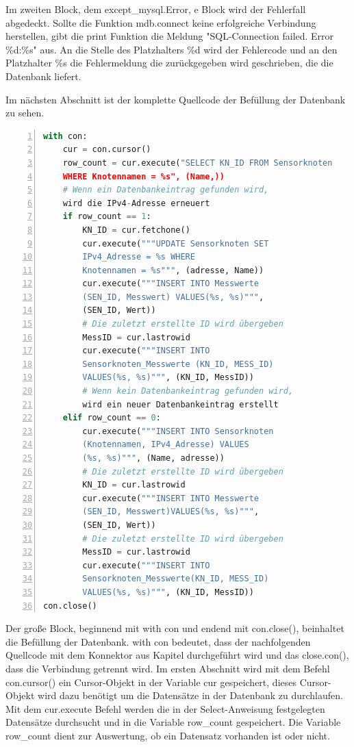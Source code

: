 Im zweiten Block, dem except\_mysql.Error, e Block wird der Fehlerfall abgedeckt. Sollte die Funktion mdb.connect keine erfolgreiche Verbindung herstellen, gibt die print Funktion die Meldung "SQL-Connection failed. Error \%d:\%s" aus. An die Stelle des Platzhalters \%d wird der Fehlercode und an den Platzhalter \%s die Fehlermeldung die zurückgegeben wird geschrieben, die die Datenbank liefert.

Im nächsten Abschnitt ist der komplette Quellcode der Befüllung der Datenbank zu sehen.
\begin{lstlisting}[caption=Befüllen der Datenbank,frame=single,numbers=left,language=Python,showstringspaces=false]
with con:
	cur = con.cursor()
	row_count = cur.execute("SELECT KN_ID FROM Sensorknoten
	WHERE Knotennamen = %s", (Name,))
	# Wenn ein Datenbankeintrag gefunden wird,
	wird die IPv4-Adresse erneuert
	if row_count == 1:
		KN_ID = cur.fetchone()
		cur.execute("""UPDATE Sensorknoten SET
		IPv4_Adresse = %s WHERE
		Knotennamen = %s""", (adresse, Name))
		cur.execute("""INSERT INTO Messwerte 
		(SEN_ID, Messwert) VALUES(%s, %s)""",
		(SEN_ID, Wert))
		# Die zuletzt erstellte ID wird übergeben
		MessID = cur.lastrowid
		cur.execute("""INSERT INTO 
		Sensorknoten_Messwerte (KN_ID, MESS_ID)
		VALUES(%s, %s)""", (KN_ID, MessID))
		# Wenn kein Datenbankeintrag gefunden wird,
		wird ein neuer Datenbankeintrag erstellt
	elif row_count == 0:
		cur.execute("""INSERT INTO Sensorknoten
		(Knotennamen, IPv4_Adresse) VALUES
		(%s, %s)""", (Name, adresse))
		# Die zuletzt erstellte ID wird übergeben
		KN_ID = cur.lastrowid
		cur.execute("""INSERT INTO Messwerte
		(SEN_ID, Messwert)VALUES(%s, %s)""",
		(SEN_ID, Wert))
		# Die zuletzt erstellte ID wird übergeben
		MessID = cur.lastrowid
		cur.execute("""INSERT INTO 
		Sensorknoten_Messwerte(KN_ID, MESS_ID)
		VALUES(%s, %s)""", (KN_ID, MessID))
con.close()
\end{lstlisting}
Der große Block, beginnend mit with con und endend mit con.close(), beinhaltet die Befüllung der Datenbank. with con bedeutet, dass der nachfolgenden Quellcode mit dem Konnektor aus Kapitel  durchgeführt wird und das close.con(), dass die Verbindung getrennt wird. Im ersten Abschnitt wird mit dem Befehl con.cursor() ein Cursor-Objekt in der Variable cur gespeichert, dieses Cursor-Objekt wird dazu benötigt um die Datensätze in der Datenbank zu durchlaufen. Mit dem cur.execute Befehl werden die in der Select-Anweisung festgelegten Datensätze durchsucht und in die Variable row\_count gespeichert. Die Variable row\_count dient zur Auswertung, ob ein Datensatz vorhanden ist oder nicht.\hfill
